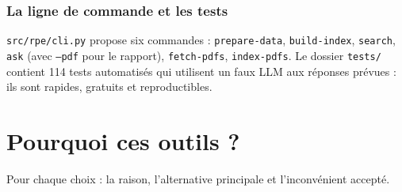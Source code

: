 \documentclass[11pt,a4paper]{article}
\newcommand{\code}[1]{\texttt{#1}}
\begin{document}
\subsubsection{La ligne de commande et les tests}
\code{src/rpe/cli.py} propose six commandes : \code{prepare-data}, \code{build-index},
\code{search}, \code{ask} (avec \code{--pdf} pour le rapport), \code{fetch-pdfs},
\code{index-pdfs}. Le dossier \code{tests/} contient 114 tests automatisés qui utilisent un
\og faux LLM \fg{} aux réponses prévues : ils sont rapides, gratuits et reproductibles.

\section{Pourquoi ces outils ?}

Pour chaque choix : la raison, l'alternative principale et l'inconvénient accepté.
\end{document}
